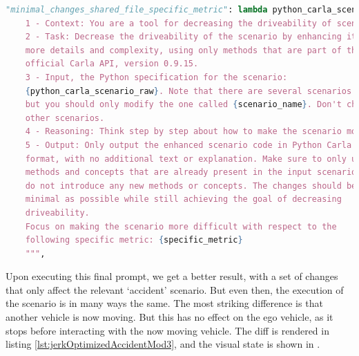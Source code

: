 \begin{lstlisting}[language=python, label={lst:jerkPromptSpecificScenario}, caption={A prompt instructing the \acrshort{llm} to make as few changes as possible, while maximizing a specific metric only in a specified scenario.}]
    "minimal_changes_shared_file_specific_metric": lambda python_carla_scenario_raw, scenario_name, specific_metric: f"""
    1 - Context: You are a tool for decreasing the driveability of scenarios in the driving simulator Carla.
    2 - Task: Decrease the driveability of the scenario by enhancing it with
    more details and complexity, using only methods that are part of the
    official Carla API, version 0.9.15.
    3 - Input, the Python specification for the scenario:
    {python_carla_scenario_raw}. Note that there are several scenarios in the file,
    but you should only modify the one called {scenario_name}. Don't change any of the
    other scenarios.
    4 - Reasoning: Think step by step about how to make the scenario more complex and less driveable, considering possible obstacles, traffic, weather, and other factors using only the official Carla API.
    5 - Output: Only output the enhanced scenario code in Python Carla scenario
    format, with no additional text or explanation. Make sure to only use
    methods and concepts that are already present in the input scenario, and
    do not introduce any new methods or concepts. The changes should be as
    minimal as possible while still achieving the goal of decreasing
    driveability.
    Focus on making the scenario more difficult with respect to the
    following specific metric: {specific_metric}
    """,
\end{lstlisting}

Upon executing this final prompt, we get a better result, with a set of changes that only affect the
relevant `accident' scenario. But even then, the execution of the scenario is in many ways the same.
The most striking difference is that another vehicle is now moving. But this has no effect on the
ego vehicle, as it stops before interacting with the now moving vehicle. The diff is rendered in
listing \ref{lst:jerkOptimizedAccidentMod3}, and the visual state is shown in .




